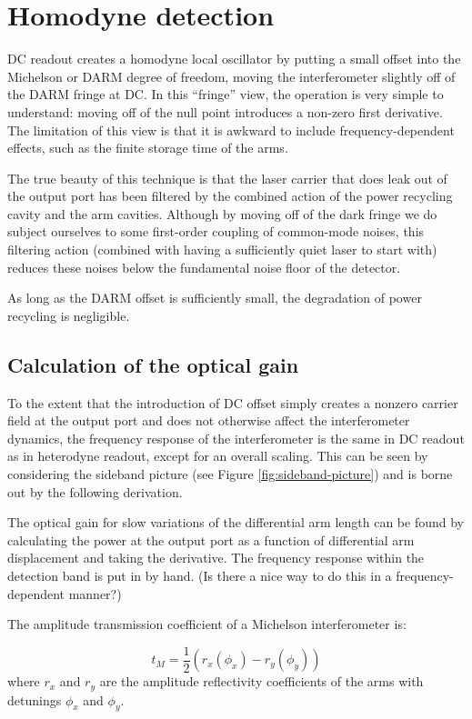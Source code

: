 \section{Homodyne detection}

DC readout creates a homodyne local oscillator by putting a small
offset into the Michelson or DARM degree of freedom, moving the
interferometer slightly off of the DARM fringe at DC.  In this
``fringe'' view, the operation is very simple to understand: moving
off of the null point introduces a non-zero first derivative.  The
limitation of this view is that it is awkward to include
frequency-dependent effects, such as the finite storage time of the
arms.

The true beauty of this technique is that the laser carrier that does
leak out of the output port has been filtered by the combined action of
the power recycling cavity and the arm cavities.  Although by moving
off of the dark fringe we do subject ourselves to some first-order
coupling of common-mode noises, this filtering action (combined with
having a sufficiently quiet laser to start with) reduces these noises
below the fundamental noise floor of the detector.  

As long as the DARM offset is sufficiently small, the degradation of
power recycling is negligible.

\subsection{Calculation of the optical gain}

To the extent that the introduction of DC offset simply creates a
nonzero carrier field at the output port and does not otherwise affect
the interferometer dynamics, the frequency response of the interferometer
is the same in DC readout as in heterodyne readout, except for an
overall scaling. This can be seen by considering the sideband picture
(see Figure \ref{fig:sideband-picture}) and is borne out by the following
derivation.%

The optical gain for slow variations of the differential arm length
can be found by calculating the power at the output port as a function
of differential arm displacement and taking the derivative. The frequency
response within the detection band is put in by hand. (Is there a
nice way to do this in a frequency-dependent manner?)

The amplitude transmission coefficient of a Michelson interferometer
is:

\begin{equation}
t_{M}=\frac{1}{2}\left(r_{x}\left(\phi_{x}\right)-r_{y}\left(\phi_{y}\right)\right)\end{equation}
where $r_{x}$ and $r_{y}$ are the amplitude reflectivity coefficients
of the arms with detunings $\phi_{x}$ and $\phi_{y}$. 

